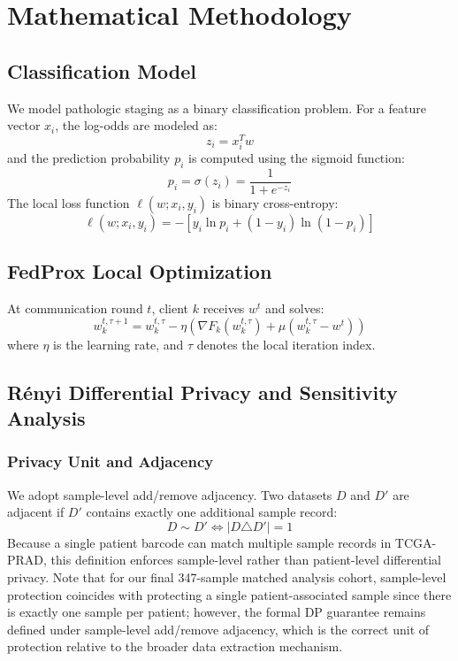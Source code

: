 \documentclass[conference]{IEEEtran}
\begin{document}
\section{Mathematical Methodology}

\subsection{Classification Model}
We model pathologic staging as a binary classification problem. For a feature vector $x_i$, the log-odds are modeled as:
\begin{equation}
z_i = x_i^T w
\end{equation}
and the prediction probability $p_i$ is computed using the sigmoid function:
\begin{equation}
p_i = \sigma(z_i) = \frac{1}{1 + e^{-z_i}}
\end{equation}
The local loss function $\ell(w; x_i, y_i)$ is binary cross-entropy:
\begin{equation}
\ell(w; x_i, y_i) = - [y_i \ln p_i + (1 - y_i) \ln(1 - p_i)]
\end{equation}

\subsection{FedProx Local Optimization}
At communication round $t$, client $k$ receives $w^t$ and solves:
\begin{equation}
w_k^{t, \tau+1} = w_k^{t, \tau} - \eta \left( \nabla F_k(w_k^{t, \tau}) + \mu (w_k^{t, \tau} - w^t) \right)
\end{equation}
where $\eta$ is the learning rate, and $\tau$ denotes the local iteration index.

\subsection{Rényi Differential Privacy and Sensitivity Analysis}

\subsubsection{Privacy Unit and Adjacency}
We adopt sample-level add/remove adjacency. Two datasets $D$ and $D'$ are adjacent if $D'$ contains exactly one additional sample record:
\begin{equation}
D \sim D' \iff |D \triangle D'| = 1
\end{equation}
Because a single patient barcode can match multiple sample records in TCGA-PRAD, this definition enforces sample-level rather than patient-level differential privacy. Note that for our final 347-sample matched analysis cohort, sample-level protection coincides with protecting a single patient-associated sample since there is exactly one sample per patient; however, the formal DP guarantee remains defined under sample-level add/remove adjacency, which is the correct unit of protection relative to the broader data extraction mechanism.
\end{document}

